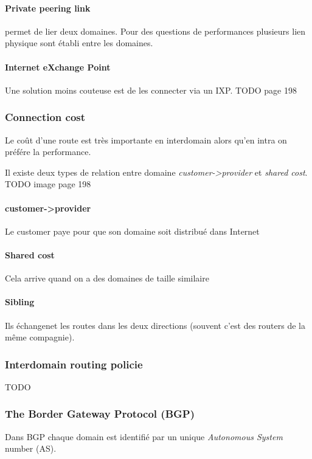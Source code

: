 \paragraph{Private peering link} permet de lier deux domaines. Pour des questions
de performances plusieurs lien physique sont établi entre les domaines.

\paragraph{Internet eXchange Point} Une solution moins couteuse est de les connecter
via un IXP. TODO page 198

\subsubsection{Connection cost} Le coût d'une route est très importante en interdomain
alors qu'en intra on préfére la performance.

Il existe deux types de relation entre domaine \textit{customer->provider} et \textit{
shared cost}.
TODO image page 198

\paragraph{customer->provider}
Le customer paye pour que son domaine soit distribué dans Internet

\paragraph{Shared cost}
Cela arrive quand on a des domaines de taille similaire

\paragraph{Sibling}
Ils échangenet les routes dans les deux directions (souvent c'est des routers
de la même compagnie).

\subsubsection{Interdomain routing policie}
TODO

\subsubsection{The Border Gateway Protocol (BGP)}
Dans BGP chaque domain est identifié par un unique \textit{Autonomous System} number (AS).

